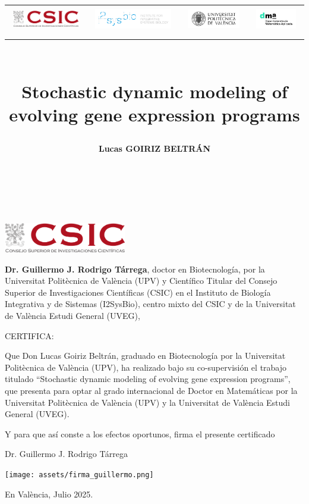 \documentclass[11pt]{book}
\title{
  \begin{center}
    \vspace{-3cm}
    \begin{adjustbox}{center}
    \begin{tabular}{cccc}
        \includegraphics[height=0.8cm]{assets/csic_logo.png} &
        \includegraphics[height=1cm]{assets/i2sysbio_logo.png} &
        \includegraphics[height=0.9cm]{assets/upv_logo.png} &
        \includegraphics[height=1cm]{assets/dma_logo.jpg}
    \end{tabular}
    \end{adjustbox}
  
    \vspace{1cm}
  \end{center}
  \vspace{2cm}
  \makebox[\textwidth][c]{\rule{.9\textwidth}{2pt}}\\[1.2ex]
  \textbf{Stochastic dynamic modeling of evolving gene expression programs}\\[0.5ex]
  \makebox[\textwidth][c]{\rule{.9\textwidth}{2pt}}
}
\author{\textbf{Lucas GOIRIZ BELTRÁN}}
\date{
    \vfill
    \textbf{
        Thesis Advisors:\\
        Dr. Guillermo RODRIGO TÁRREGA\\
        Prof. Dr. J. Alberto CONEJERO CASARES
    }
    \vspace{1cm}
    \begin{center}
    Valencia, June 2025
    \end{center}
}
\theoremstyle{definition}
\begin{document}
\maketitle
{}
\pagebreak ~

\chapter*{}
\vspace{-4cm}

\begin{flushright}
\includegraphics[width=0.4\textwidth]{assets/csic_logo.png}
\end{flushright}

\vspace{0.5cm}

\noindent\textbf{Dr. Guillermo J. Rodrigo Tárrega}, doctor en Biotecnología, por la Universitat Politècnica de València (UPV)
y Científico Titular del Consejo Superior de Investigaciones Científicas (CSIC) en el Instituto de Biología Integrativa y de Sistemas (I2SysBio),
centro mixto del CSIC y de la Universitat de València Estudi General (UVEG),

\vspace{1.5cm}

CERTIFICA:

\vspace{1.5cm}

\noindent Que Don Lucas Goiriz Beltrán, graduado en Biotecnología por la Universitat Politècnica de València (UPV), ha realizado bajo su co-supervisión el trabajo titulado
``Stochastic dynamic modeling of evolving gene expression programs'', que presenta para optar al grado internacional de Doctor en Matemáticas por la Universitat Politècnica de València (UPV) y la Universitat de València Estudi General (UVEG).

\vspace{1cm}

Y para que así conste a los efectos oportunos, firma el presente certificado

\vspace{1cm}


\begin{center}
Dr. Guillermo J. Rodrigo Tárrega

\texttt{[image: assets/firma\_guillermo.png]}

En València, Julio 2025.

\end{center}
\end{document}
